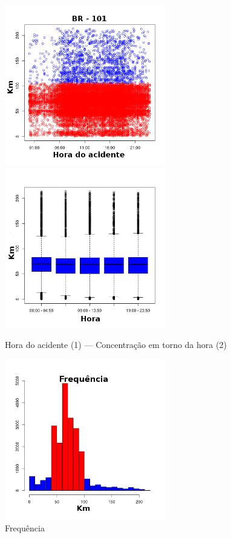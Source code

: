 \begin{figure}[h]
	\caption{Hora do acidente (1) --- Concentração em torno da hora (2) }
	\includegraphics[width=7cm,height=7cm]{Figuras/Preprocess/br101.png}
	\includegraphics[width=7cm,height=7cm]{Figuras/Preprocess/br101_2.png}
	
\end{figure}

\quad \quad
\begin{figure}[h]
	\centering
	\caption{ Frequência}
	\includegraphics[width=7cm,height=7cm]{Figuras/Preprocess/br101_4.png}
\end{figure}

